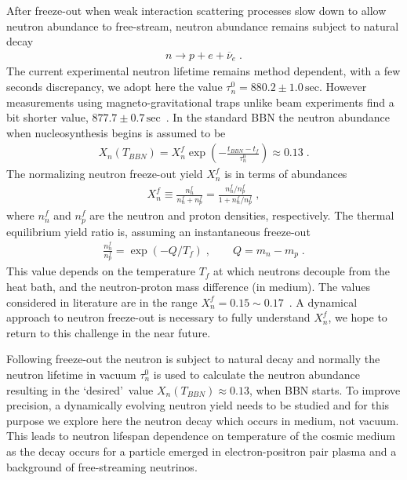 After freeze-out when weak interaction scattering processes slow down to allow neutron abundance to free-stream, neutron abundance remains subject to natural decay
\begin{align}\label{Ndec}
n\longrightarrow p+e+\overline{\nu}_e\;.
\end{align}
The current experimental neutron lifetime remains method dependent, with a few seconds discrepancy, we adopt here the value $\tau_n^0=880.2\pm1.0\,\mathrm{sec}$. However measurements using magneto-gravitational traps unlike beam experiments find a bit shorter value, $877.7\pm0.7\,\mathrm{sec}$~\cite{Pattie:2017vsj}. In the standard BBN the neutron abundance when nucleosynthesis begins is assumed to be~\cite{Pitrou:2018cgg}
\begin{align}
\label{Xn_abundance}
X_n(T_{BBN})=X_n^f\exp\left(-\frac{t_{BBN}-t_f}{\tau_n^0}\right)\approx0.13\;.
\end{align}
The normalizing neutron freeze-out yield $X_n^f$ is in terms of abundances 
\begin{align}
\label{Xn_abundance2}
X_n^f \equiv \frac{n_n^f}{n_n^f+n_p^f}= \frac{n_n^f/n_p^f}{1+n_n^f/n_p^f}\;,
\end{align}
where $n_n^f$ and $n_p^f$ are the neutron and proton densities, respectively. The thermal equilibrium yield ratio is, assuming an instantaneous freeze-out
\begin{align}
\label{Xn_abundance3}
 \frac{n_n^f}{n_p^f}= \exp\left(-Q/T_f\right)\;,\qquad Q=m_n-m_p\;.
\end{align}
This value depends on the temperature $T_f$ at which neutrons decouple from the heat bath, and the neutron-proton mass difference (in medium). The values considered in literature are in the range $X_n^f=0.15\sim0.17$~\cite{Pitrou:2018cgg}. A dynamical approach to neutron freeze-out is necessary to fully understand $X_n^f$, we hope to return to this challenge in the near future.

Following freeze-out the neutron is subject to natural decay and normally the neutron lifetime in vacuum $\tau_n^0$ is used to calculate the neutron abundance resulting in the \lq desired\rq\ value $X_n(T_{BBN})\approx0.13$,  when BBN starts. To improve precision, a dynamically evolving neutron yield needs to be studied and for this purpose we explore here the neutron decay which occurs in medium, not vacuum. This leads to neutron lifespan dependence on temperature of the cosmic medium as the decay occurs for a particle emerged in electron-positron pair plasma and a background of free-streaming neutrinos.

